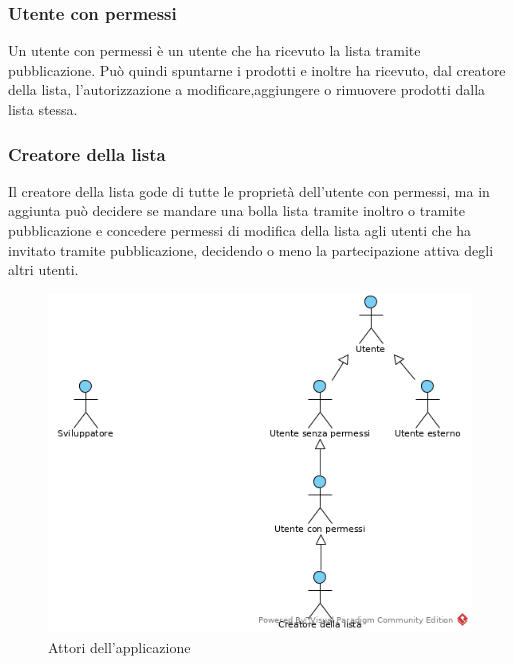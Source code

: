 \subsubsection{Utente con permessi}
Un utente con permessi è un utente che ha ricevuto la lista tramite pubblicazione. Può quindi spuntarne i prodotti e inoltre ha ricevuto, dal creatore della lista, l'autorizzazione a modificare,aggiungere o rimuovere prodotti dalla lista stessa.
\subsubsection{Creatore della lista}
Il creatore della lista gode di tutte le proprietà dell'utente con permessi, ma in aggiunta può decidere se mandare una bolla lista tramite inoltro o tramite pubblicazione e concedere permessi di modifica della lista agli utenti che ha invitato tramite pubblicazione, decidendo o meno la partecipazione attiva degli altri utenti.
\label{Attori}
\begin{figure}[ht]
	\centering
	\includegraphics[scale=1]{Usecases/img/Attori.png}
	\caption{Attori dell'applicazione}
\end{figure}


















